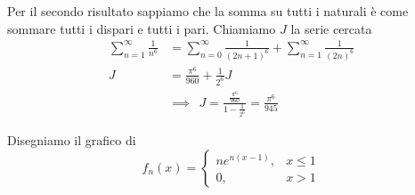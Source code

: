 Per il secondo risultato sappiamo che la somma su tutti i naturali è come sommare tutti i dispari e tutti i pari. Chiamiamo $J$ la serie cercata
\begin{align*}
\sum\limits^{\infty}_{n = 1}\frac{1}{n^{6}} & = \sum\limits^{\infty}_{n = 0}\frac{1}{(2n + 1)^{6}} + \sum\limits^{\infty}_{n = 1}\frac{1}{(2n)^{6}}\\
J & = \frac{\pi^{6}}{960} + \frac{1}{2^{6}} J\\
 & \implies \ \ J = \frac{\frac{\pi^{6}}{960}}{1 - \frac{1}{2^{6}}} = \frac{\pi^{6}}{945}
\end{align*}

\Soluzione

Disegniamo il grafico di
\begin{equation*}
f_{n}(x) =
\begin{cases}
ne^{n(x - 1)}, & x \leq 1\\
0, & x > 1
\end{cases}
\end{equation*}

